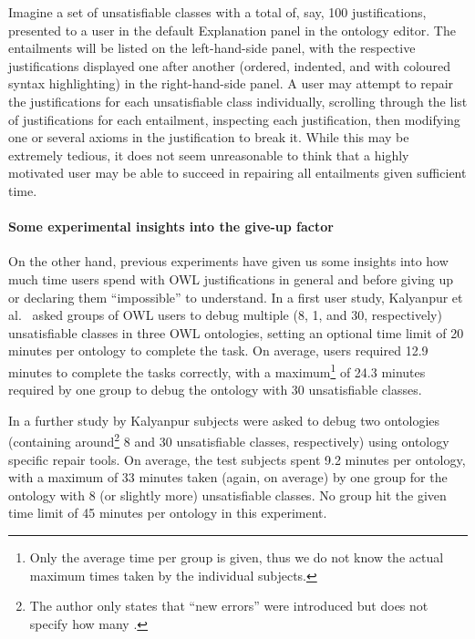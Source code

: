 Imagine a set of unsatisfiable classes with a total of, say, 100 justifications, presented to a user in the default Explanation panel in the \protege ontology editor. The entailments will be listed on the left-hand-side panel, with the respective justifications displayed one after another (ordered, indented, and with coloured syntax highlighting) in the right-hand-side panel. A user may attempt to repair the justifications for each unsatisfiable class individually, scrolling through the list of justifications for each entailment, inspecting each justification, then modifying one or several axioms in the justification to break it. While this may be extremely tedious, it does not seem unreasonable to think that a highly motivated user may be able to succeed in repairing all entailments given sufficient time. 

\paragraph{Some experimental insights into the give-up factor}
On the other hand, previous experiments have given us some insights into how much time users spend with OWL justifications in general and before giving up or declaring them \enquote{impossible} to understand. In a first user study, Kalyanpur et al.\ \cite{kalyanpur05mi} asked groups of OWL users to debug multiple (8, 1, and 30, respectively) unsatisfiable classes in three OWL ontologies, setting an optional time limit of 20 minutes per ontology to complete the task. On average, users required 12.9 minutes to complete the tasks correctly, with a maximum\footnote{Only the average time per group is given, thus we do not know the actual maximum times taken by the individual subjects.} of 24.3 minutes required by one group to debug the ontology with 30 unsatisfiable classes. 

In a further study by Kalyanpur \cite{kalyanpur06nm} subjects were asked to debug two ontologies (containing around\footnote{The author only states that \enquote{new errors} were introduced but does not specify how many \cite[p 96]{kalyanpur06nm}.}  8 and 30 unsatisfiable classes, respectively) using ontology specific repair tools. On average, the test subjects spent 9.2 minutes per ontology, with a maximum of 33 minutes taken (again, on average) by one group for the ontology with 8 (or slightly more) unsatisfiable classes. No group hit the given time limit of 45 minutes per ontology in this experiment.

